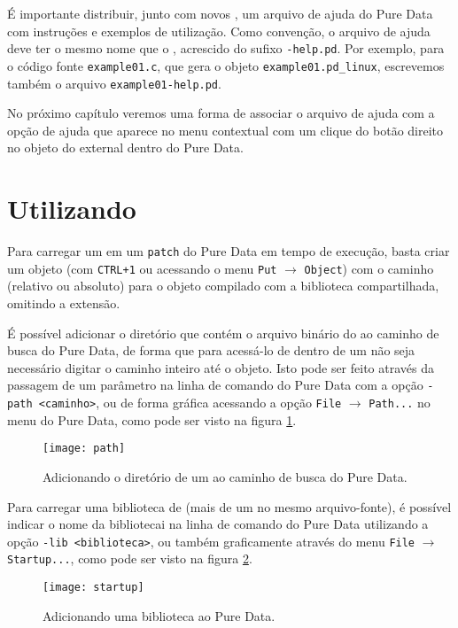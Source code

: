 É importante distribuir, junto com novos \externals, um arquivo de ajuda do
Pure Data com instruções e exemplos de utilização. Como convenção, o arquivo
de ajuda deve ter o mesmo nome que o \external, acrescido do sufixo
\texttt{-help.pd}. Por exemplo, para o código fonte \texttt{example01.c}, que
gera o objeto \texttt{example01.pd\_linux}, escrevemos também o arquivo
\texttt{example01-help.pd}.

No próximo capítulo veremos uma forma de associar o arquivo de ajuda com a
opção de ajuda que aparece no menu contextual com um clique do botão direito
no objeto do external dentro do Pure Data.

\section{Utilizando \externals}
\label{sec:using}

Para carregar um \external em um \texttt{patch} do Pure Data em tempo de
execução, basta criar um objeto (com \texttt{CTRL+1} ou acessando o menu
\texttt{Put} $\rightarrow$ \texttt{Object}) com o caminho (relativo ou
absoluto) para o objeto compilado com a biblioteca compartilhada, omitindo a
extensão.

É possível adicionar o diretório que contém o arquivo binário do \external ao
caminho de busca do Pure Data, de forma que para acessá-lo de dentro de um
\patch não seja necessário digitar o caminho inteiro até o objeto. Isto pode
ser feito através da passagem de um parâmetro na linha de comando do Pure Data
com a opção \texttt{-path <caminho>}, ou de forma gráfica acessando a opção
\texttt{File} $\rightarrow$ \texttt{Path...} no menu do Pure Data,
como pode ser visto na figura \ref{fig:search-path}.

\begin{figure}[h!]
  \centering
  \texttt{[image: path]}
  \caption{Adicionando o diretório de um \external ao caminho de busca do Pure Data.}
  \label{fig:search-path}
\end{figure}

Para carregar uma biblioteca de \externals (mais de um \external no mesmo
arquivo-fonte), é possível indicar o nome da bibliotecai na linha
de comando do Pure Data utilizando a opção \texttt{-lib <biblioteca>}, ou
também graficamente através do menu \texttt{File} $\rightarrow$
\texttt{Startup...}, como pode ser visto na figura \ref{fig:lib}.

\begin{figure}[h!]
  \centering
  \texttt{[image: startup]}
  \caption{Adicionando uma biblioteca ao Pure Data.}
  \label{fig:lib}
\end{figure}

